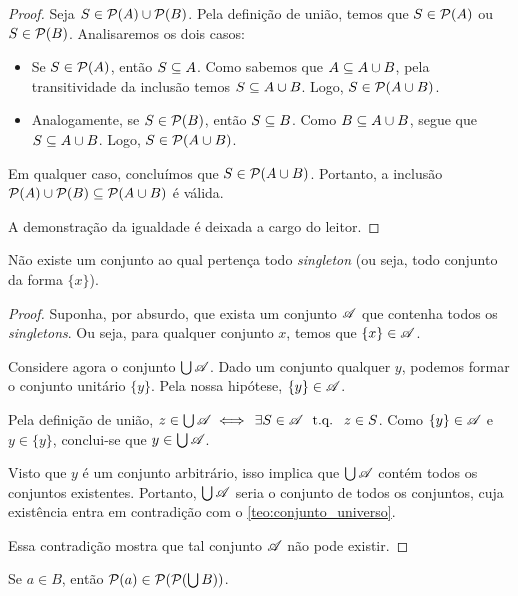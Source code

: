 \begin{proof}
    Seja \(S \in \mathcal{P}(A) \cup \mathcal{P}(B)\). Pela definição de união, temos que \(S \in \mathcal{P}(A)\) ou \(S \in \mathcal{P}(B)\). Analisaremos os dois casos:
    \begin{itemize}
        \item Se \(S \in \mathcal{P}(A)\), então \(S \subseteq A\). Como sabemos que \(A \subseteq A \cup B\), pela transitividade da inclusão temos \(S \subseteq A \cup B\). Logo, \(S \in \mathcal{P}(A \cup B)\).
        \item Analogamente, se \(S \in \mathcal{P}(B)\), então \(S \subseteq B\). Como \(B \subseteq A \cup B\), segue que \(S \subseteq A \cup B\). Logo, \(S \in \mathcal{P}(A \cup B)\).
    \end{itemize}
    Em qualquer caso, concluímos que \(S \in \mathcal{P}(A \cup B)\). Portanto, a inclusão \(\mathcal{P}(A) \cup \mathcal{P}(B) \subseteq \mathcal{P}(A \cup B)\) é válida.

    A demonstração da igualdade é deixada a cargo do leitor.
\end{proof}

\begin{proposicao}
    \label{prop:inexistencia_conjunto_unitarios}
    Não existe um conjunto ao qual pertença todo \textit{singleton} (ou seja, todo conjunto da forma \(\{x\}\)).
\end{proposicao}

\begin{proof}
    Suponha, por absurdo, que exista um conjunto \(\mathscr{A}\) que contenha todos os \textit{singletons}. Ou seja, para qualquer conjunto \(x\), temos que \(\{x\} \in \mathscr{A}\).

    Considere agora o conjunto \(\bigcup \mathscr{A}\). Dado um conjunto qualquer \(y\), podemos formar o conjunto unitário \(\{y\}\). Pela nossa hipótese, \(\{y\} \in \mathscr{A}\).

    Pela definição de união, \(z \in \bigcup \AAA \iff \exists S \in \AAA \tq z \in S\). Como \(\{y\} \in \mathscr{A}\) e \(y \in \{y\}\), conclui-se que \(y \in \bigcup \mathscr{A}\).

    Visto que \(y\) é um conjunto arbitrário, isso implica que \(\bigcup \mathscr{A}\) contém todos os conjuntos existentes. Portanto, \(\bigcup \mathscr{A}\) seria o conjunto de todos os conjuntos, cuja existência entra em contradição com o \autoref{teo:conjunto_universo}.

    Essa contradição mostra que tal conjunto \(\mathscr{A}\) não pode existir.
\end{proof}

\begin{proposicao}
    \label{prop:inclusao_partes_duplo}
    Se \(a \in B\), então \(\mathcal{P}(a) \in \mathcal{P}(\mathcal{P}(\bigcup B))\).
\end{proposicao}

